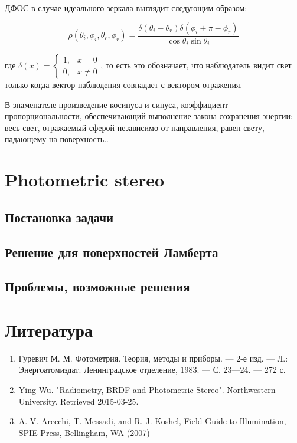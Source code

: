 \documentclass[12pt]{article}
\begin{document}
ДФОС в случае идеального зеркала выглядит следующим образом:

\begin{equation}
  \rho(\theta_i,\phi_i,\theta_r,\phi_r)=\frac{\delta(\theta_i-\theta_r)\delta(\phi_i+\pi-\phi_r)}{\cos\theta_i\sin\theta_i}
\end{equation}

где $\delta(x)=\begin{cases}
    1, & x=0    \\
    0, & x\neq0
  \end{cases}$, то есть это обозначает, что наблюдатель видит свет только когда вектор наблюдения совпадает с вектором отражения.

В знаменателе произведение косинуса и синуса, коэффициент пропорциональности, обеспечивающий выполнение закона сохранения энергии: весь свет, отражаемый сферой независимо от направления, равен свету, падающему на поверхность..




\section{Photometric stereo}

\subsection{Постановка задачи}
\subsection{Решение для поверхностей Ламберта}
\subsection{Проблемы, возможные решения}

\section{Литература}
\begin{enumerate}
  \item Гуревич М. М. Фотометрия. Теория, методы и приборы. — 2-е изд. — Л.: Энергоатомиздат. Ленинградское отделение, 1983. — С. 23—24. — 272 с.
  \item Ying Wu. "Radiometry, BRDF and Photometric Stereo". Northwestern University. Retrieved 2015-03-25.
  \item A. V. Arecchi, T. Messadi, and R. J. Koshel, Field Guide to Illumination, SPIE Press, Bellingham, WA (2007)
\end{enumerate}
\end{document}
